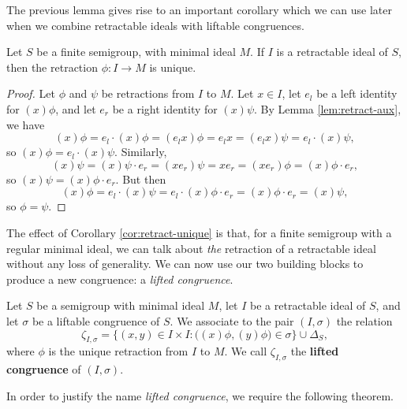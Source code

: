 The previous lemma gives rise to an important corollary which we can use later
when we combine retractable ideals with liftable congruences.

\begin{corollary}
  \label{cor:retract-unique}
  Let $S$ be a finite semigroup, with minimal ideal $M$.  If $I$ is a
  retractable ideal of $S$, then the retraction $\phi:I \to M$ is unique.
  \begin{proof}
    Let $\phi$ and $\psi$ be retractions from $I$ to $M$.  Let $x \in I$,
    let $e_l$ be a left identity for $(x)\phi$, and let $e_r$ be a right
    identity for $(x)\psi$.  By
    Lemma \ref{lem:retract-aux}, we have
    $$(x)\phi
    = e_l \cdot (x)\phi
    = (e_lx)\phi
    = e_lx
    = (e_lx)\psi
    = e_l \cdot (x)\psi,$$
    so $(x)\phi = e_l \cdot (x)\psi$.  Similarly,
    $$(x)\psi
    = (x)\psi \cdot e_r
    = (xe_r)\psi
    = xe_r
    = (xe_r)\phi
    = (x)\phi \cdot e_r,$$
    so $(x)\psi = (x)\phi \cdot e_r$.  But then
    $$(x)\phi
    = e_l \cdot (x)\psi
    = e_l \cdot (x)\phi \cdot e_r
    = (x)\phi \cdot e_r
    = (x)\psi,$$
    so $\phi = \psi$.
  \end{proof}
\end{corollary}

The effect of Corollary \ref{cor:retract-unique} is that, for a finite
semigroup with a regular minimal ideal, we can talk about \textit{the} retraction of a
retractable ideal without any loss of generality.  We can now use our two
building blocks to produce a new congruence: a \textit{lifted congruence}.

\begin{definition}
  \label{def:lifted-congruence}
  Let $S$ be a semigroup with minimal ideal $M$, let $I$ be a retractable
  ideal of $S$, and let $\sigma$ be a liftable congruence of $S$.  We associate
  to the pair $(I,\sigma)$ the relation
  $$\zeta_{I,\sigma} = \Big\{(x,y) \in I \times I :
  \big((x)\phi,(y)\phi\big) \in \sigma\Big\} \cup \Delta_S,$$
  where $\phi$ is the unique retraction from $I$ to $M$.
  We call $\zeta_{I,\sigma}$ the \textbf{lifted congruence} of $(I,\sigma)$.
\end{definition}

In order to justify the name \textit{lifted congruence}, we require the
following theorem.

